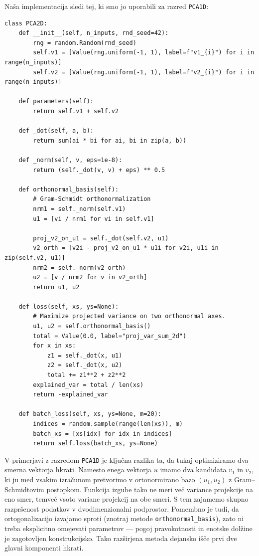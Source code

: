 Naša implementacija sledi tej, ki smo jo uporabili za razred \texttt{PCA1D}:
\vspace*{3mm}
\begin{lstlisting}
class PCA2D:
    def __init__(self, n_inputs, rnd_seed=42):
        rng = random.Random(rnd_seed)
        self.v1 = [Value(rng.uniform(-1, 1), label=f"v1_{i}") for i in range(n_inputs)]
        self.v2 = [Value(rng.uniform(-1, 1), label=f"v2_{i}") for i in range(n_inputs)]

    def parameters(self):
        return self.v1 + self.v2

    def _dot(self, a, b):
        return sum(ai * bi for ai, bi in zip(a, b))

    def _norm(self, v, eps=1e-8):
        return (self._dot(v, v) + eps) ** 0.5

    def orthonormal_basis(self):
        # Gram-Schmidt orthonormalization
        nrm1 = self._norm(self.v1)
        u1 = [vi / nrm1 for vi in self.v1]

        proj_v2_on_u1 = self._dot(self.v2, u1)
        v2_orth = [v2i - proj_v2_on_u1 * u1i for v2i, u1i in zip(self.v2, u1)]
        nrm2 = self._norm(v2_orth)
        u2 = [v / nrm2 for v in v2_orth]
        return u1, u2

    def loss(self, xs, ys=None):
        # Maximize projected variance on two orthonormal axes.
        u1, u2 = self.orthonormal_basis()
        total = Value(0.0, label="proj_var_sum_2d")
        for x in xs:
            z1 = self._dot(x, u1)
            z2 = self._dot(x, u2)
            total += z1**2 + z2**2
        explained_var = total / len(xs)
        return -explained_var

    def batch_loss(self, xs, ys=None, m=20):
        indices = random.sample(range(len(xs)), m)
        batch_xs = [xs[idx] for idx in indices]
        return self.loss(batch_xs, ys=None)
\end{lstlisting}

V primerjavi z razredom \texttt{PCA1D} je ključna razlika ta, da tukaj optimiziramo dva smerna vektorja hkrati. Namesto enega vektorja $u$ imamo dva kandidata $v_1$ in $v_2$, ki ju med vsakim izračunom pretvorimo v ortonormirano bazo $(u_1, u_2)$ z Gram--Schmidtovim postopkom. Funkcija izgube tako ne meri več variance projekcije na eno smer, temveč vsoto varianc projekcij na obe smeri. S tem zajamemo skupno razpršenost podatkov v dvodimenzionalni podprostor. Pomembno je tudi, da ortogonalizacijo izvajamo sproti (znotraj metode \texttt{orthonormal\_basis}), zato ni treba eksplicitno omejevati parametrov — pogoj pravokotnosti in enotske dolžine je zagotovljen konstrukcijsko. Tako razširjena metoda dejansko išče prvi dve glavni komponenti hkrati.

